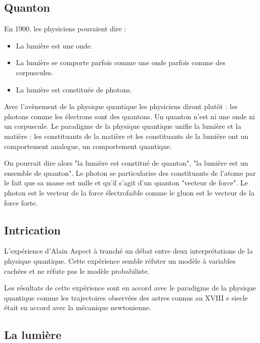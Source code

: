 \subsection{Quanton}

En 1900, les physiciens pouvaient dire : 

\begin{itemize}[leftmargin=1cm, label=, itemsep=3pt]
\item La lumière est une onde.
\item La lumière se comporte parfois comme une onde parfois comme des corpuscules.
\item La lumière est constituée de photons.
\end{itemize}

Avec l'avènement de la physique quantique les physiciens diront plutôt : les photons comme les électrons sont des quantons. Un quanton n'est ni une onde ni un corpuscule. Le paradigme de la physique quantique unifie la lumière et la matière : les constituants de la matière et les constituants de la lumière ont un comportement analogue, un comportement quantique.

On pourrait dire alors "la lumière est constitué de quanton", "la lumière est un ensemble de quanton". Le photon se particularise des constituants de l'atome par le fait que sa masse est nulle et qu'il s'agit d'un quanton "vecteur de force". Le photon est le vecteur de la force électrofaible comme le gluon est le vecteur de la force forte.

\subsection{Intrication}
L'expérience d'Alain Aspect à tranché un débat entre deux interprétations de la physique quantique. Cette expérience semble réfuter un modèle à variables cachées et ne réfute pas le modèle probabiliste.

Les résultats de cette expérience sont en accord avec le paradigme de la physique quantique comme les trajectoires observées des astres connus au XVIII e siecle était en accord avec la mécanique newtonienne.

\subsection{La lumière}

\begin{center}
\end{center}

